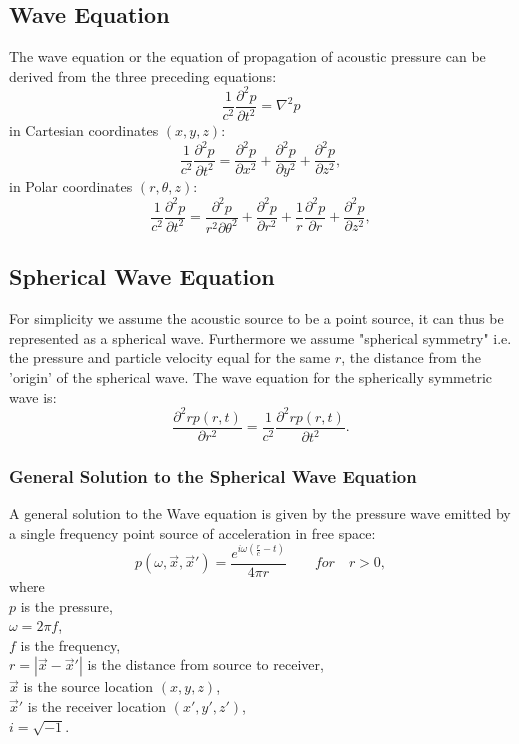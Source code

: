\subsection{Wave Equation}
The wave equation or the equation of propagation of acoustic pressure can be derived from the three preceding equations:
\begin{equation}
    \frac{1}{c^2}\frac{\partial^2p}{\partial t^2} = \nabla^2p
\end{equation}
in Cartesian coordinates $(x,y,z)$:
\begin{equation}
    \frac{1}{c^2}\frac{\partial^2p}{\partial t^2} = \frac{\partial^2p}{\partial x^2} + \frac{\partial^2p}{\partial y^2} + \frac{\partial^2p}{\partial z^2},
\end{equation}
in Polar coordinates $(r,\theta, z)$:
\begin{equation}
    \frac{1}{c^2}\frac{\partial^2p}{\partial t^2} = \frac{\partial^2p}{r^2\partial \theta^2} + \frac{\partial^2p}{\partial r^2} + \frac{1}{r}\frac{\partial^2p}{\partial r} + \frac{\partial^2p}{\partial z^2},
\end{equation}

\subsection{Spherical Wave Equation}

For simplicity we assume the acoustic source to be a point source, it can thus be represented as a spherical wave. Furthermore we assume "spherical symmetry" i.e. the pressure and particle velocity equal for the same $r$, the distance from the 'origin' of the spherical wave. The wave equation for the spherically symmetric wave is\cite{Waves2004}:
\begin{equation}
    \frac{\partial^2rp(r,t)}{\partial r^2} = \frac{1}{c^2}\frac{\partial^2rp(r,t)}{\partial t^2}.
\end{equation}
\subsubsection{General Solution to the Spherical Wave Equation}
A general solution to the Wave equation is given by the pressure wave emitted by a single frequency point source of acceleration in free space\cite{Allen1979}:
\begin{equation}
    p(\omega,\Vec{x},\Vec{x}') = \frac{e^{i\omega(\frac{r}{c}-t)}}{4\pi r}\quad\quad for\quad r > 0,
\end{equation}
where\\
$p$ is the pressure,\\
$\omega=2\pi f$,\\
$f$ is the frequency,\\
$r=|\Vec{x}-\Vec{x}'|$ is the distance from source to receiver,\\
$\Vec{x}$ is the source location $(x,y,z)$,\\
$\Vec{x}'$ is the receiver location $(x',y',z')$,\\
$i=\sqrt{-1}$.\\


